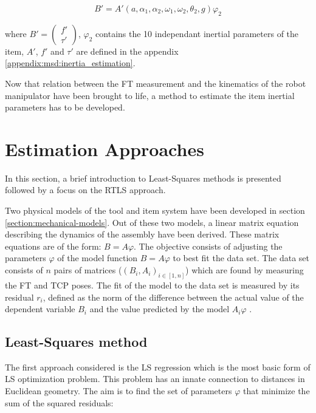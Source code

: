 \documentclass[/home/francois/latex/report/main.tex]{subfiles}
\begin{document}
 \begin{equation}
   \label{eq:background:rmsd_inertia_estimation}
 B' = A'(a, \alpha_1, \alpha_2, \omega_1, \omega_2, \theta_2, g) \varphi_2
 \end{equation}

 where  $B' = \begin{pmatrix} f' \\ \tau' \end{pmatrix}$, $\varphi_2$ contains the 10 independant inertial parameters of the item, $A'$, $f'$ and $\tau'$ are defined in the appendix \ref{appendix:msd:inertia_estimation}.

Now that relation between the \ac{FT} measurement and the kinematics of the robot manipulator have been brought to life, a method to estimate the item inertial parameters has to be developed.

\section{Estimation Approaches}
\label{section:estimation}

In this section, a brief introduction to Least-Squares methods is presented followed by a focus on the \ac{RTLS} approach.

Two physical models of the tool and item system have been developed in section \ref{section:mechanical-models}. Out of these two models, a linear matrix equation describing the dynamics of the assembly have been derived. These matrix equations are of the form: $B = A\varphi$. The objective consists of adjusting the parameters $\varphi$ of the model function $B = A\varphi$ to best fit the data set. The data set consists of $n$ pairs of matrices ($(B_i, A_i)_{i \in [1, n]}$) which are found by measuring the \ac{FT} and \ac{TCP} poses. The fit of the model to the data set is measured by its residual $r_i$, defined as the norm of the difference between the actual value of the dependent variable $B_i$ and the value predicted by the model $A_i \varphi$ \cite{Simoncelli2003}.

\subsection{Least-Squares method}
\label{subsection:ls}

The first approach considered is the \ac{LS} regression which is the most basic form of \ac{LS} optimization problem. This problem has an innate connection to distances in Euclidean geometry. The aim is to find the set of parameters $\varphi$ that minimize the sum of the squared residuals:
\end{document}
